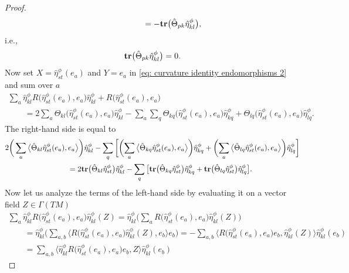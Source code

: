 \documentclass[10pt,a4paper]{amsart}
\newcommand{\tr}{\mbox{\bf tr}}
\numberwithin{equation}{section}
\begin{document}
\begin{proof}
\begin{gather*}
\hphantom{\tr\big(\hat\Theta_{pk}\hat\eta_{kl}^\phi\big)}{}=
 -\tr\big(\hat\Theta_{pk}\hat\eta_{kl}^\phi\big) ,
\end{gather*}
i.e.,
\begin{gather}
\tr\big(\hat\Theta_{pk}\hat\eta_{kl}^\phi\big) =0.\label{eq: vanishing traces 4}
\end{gather}
Now set $X=\hat\eta_{st}^\phi (e_a)$ and $Y=e_a$ in \eqref{eq: curvature identity endomorphisms 2} and sum over $a$
\begin{gather*}
\sum_a\hat{\eta}^\phi_{kl}{R\big(\hat\eta_{st}^\phi(e_a),e_a\big)}\hat{\eta}^\phi_{kl}+{R\big(\hat\eta_{st}^\phi(e_a),e_a\big)}\\
\qquad{} = 2\sum_a\Theta_{kl}\big(\hat\eta_{st}^\phi(e_a),e_a\big)\hat\eta_{kl}^\phi
 -\sum_a\sum_{q} \Theta_{kq}\big(\hat\eta_{st}^\phi(e_a),e_a\big) \hat{\eta}^\phi_{kq}+ \Theta_{lq}\big(\hat\eta_{st}^\phi(e_a),e_a\big)\hat{\eta}^\phi_{lq}.
\end{gather*}
The right-hand side is equal to
\begin{gather*}
 2\bigg(\sum_a\big\langle \hat\Theta_{kl}\hat\eta_{st}^\phi(e_a),e_a\big\rangle \bigg)\hat\eta_{kl}^\phi
 -\sum_{q} \bigg[\bigg(\!\sum_a\big\langle \hat\Theta_{kq}\hat\eta_{st}^\phi(e_a),e_a\big\rangle \bigg) \hat{\eta}^\phi_{kq}
 + \bigg(\!\sum_a\big\langle \hat\Theta_{lq}\hat\eta_{st}^\phi(e_a),e_a\big\rangle \bigg)\hat{\eta}^\phi_{lq}\bigg] \\
\qquad{} = 2\tr\big(\hat\Theta_{kl}\hat\eta_{st}^\phi\big)\hat\eta_{kl}^\phi
 -\sum_{q} \big[\tr\big(\hat\Theta_{kq}\hat\eta_{st}^\phi\big) \hat{\eta}^\phi_{kq}
 + \tr\big(\hat\Theta_{lq}\hat\eta_{st}^\phi\big)\hat{\eta}^\phi_{lq}\big] .
\end{gather*}
Now let us analyze the terms of the left-hand side by evaluating it on a vector field $Z\in\Gamma(TM)$
\begin{gather*}
\sum_a\hat{\eta}^\phi_{kl}{R\big(\hat\eta_{st}^\phi(e_a),e_a\big)}\hat{\eta}^\phi_{kl} (Z)
 =\hat{\eta}^\phi_{kl}\bigg(\sum_a{R\big(\hat\eta_{st}^\phi(e_a),e_a\big)}\hat{\eta}^\phi_{kl}(Z)\bigg)\\
 \qquad {} =\hat{\eta}^\phi_{kl}\bigg(\sum_{a,b}\big\langle {R\big(\hat\eta_{st}^\phi(e_a),e_a\big)}\hat{\eta}^\phi_{kl}(Z),e_b\big\rangle e_b\bigg)
 = -\sum_{a,b}\big\langle {R\big(\hat\eta_{st}^\phi(e_a),e_a\big)}e_b,\hat{\eta}^\phi_{kl}(Z)\big\rangle \hat{\eta}^\phi_{kl}(e_b)\\
 \qquad {}= \sum_{a,b}\big\langle \hat{\eta}^\phi_{kl}{R\big(\hat\eta_{st}^\phi(e_a),e_a\big)}e_b,Z\big\rangle \hat{\eta}^\phi_{kl}(e_b)

\end{gather*}
\end{proof}
\end{document}
